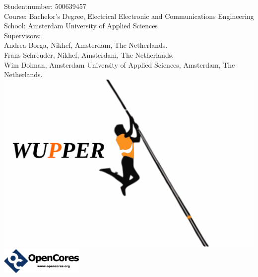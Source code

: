 \begin{titlepage}
	\maketitle
	\thispagestyle{titlepage}
	\begin{center}
	Studentnumber: 500639457\\
	Course: Bachelor's Degree, Electrical Electronic and Communications Engineering\\
	School: Amsterdam University of Applied Sciences  \\
	Supervisors:\\
	 Andrea Borga, Nikhef, Amsterdam, The Netherlands.\\
	 Frans Schreuder, Nikhef, Amsterdam, The Netherlands.\\
	 Wim Dolman, Amsterdam University of Applied Sciences, Amsterdam, The Netherlands.\\
	\vspace{2cm}
	\includegraphics[width=1\textwidth]{figures/random_wupper_orange.pdf}
	\hspace{3cm}
	\includegraphics[width=0.3\textwidth]{figures/oclogo.jpg} 	 
	
	\end{center}
\end{titlepage}
\newpage